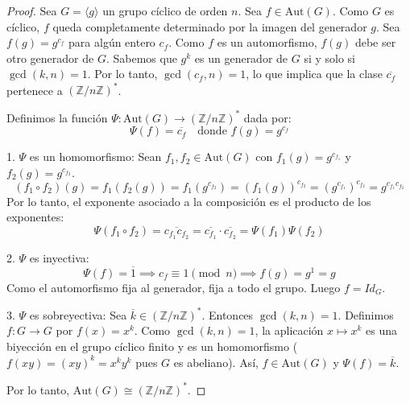 \begin{proof}
    Sea $G = \langle g \rangle$ un grupo cíclico de orden $n$.
    Sea $f \in \text{Aut}(G)$. Como $G$ es cíclico, $f$ queda completamente determinado por la imagen del generador $g$.
    Sea $f(g) = g^{c_f}$ para algún entero $c_f$.
    Como $f$ es un automorfismo, $f(g)$ debe ser otro generador de $G$.
    Sabemos que $g^k$ es un generador de $G$ si y solo si $\gcd(k, n) = 1$.
    Por lo tanto, $\gcd(c_f, n) = 1$, lo que implica que la clase $\overline{c_f}$ pertenece a $(\mathbb{Z}/n\mathbb{Z})^*$.
    
    Definimos la función $\Psi: \text{Aut}(G) \to (\mathbb{Z}/n\mathbb{Z})^*$ dada por:
    \begin{equation*}
        \Psi(f) = \overline{c_f} \quad \text{donde } f(g) = g^{c_f}
    \end{equation*}
    
    1. $\Psi$ es un homomorfismo:
    Sean $f_1, f_2 \in \text{Aut}(G)$ con $f_1(g) = g^{c_{f_1}}$ y $f_2(g) = g^{c_{f_2}}$.
    \begin{equation*}
        (f_1 \circ f_2)(g) = f_1(f_2(g)) = f_1(g^{c_{f_2}}) = (f_1(g))^{c_{f_2}} = (g^{c_{f_1}})^{c_{f_2}} = g^{c_{f_1} c_{f_2}}
    \end{equation*}
    Por lo tanto, el exponente asociado a la composición es el producto de los exponentes:
    \begin{equation*}
        \Psi(f_1 \circ f_2) = \overline{c_{f_1} c_{f_2}} = \overline{c_{f_1}} \cdot \overline{c_{f_2}} = \Psi(f_1) \Psi(f_2)
    \end{equation*}
    
    2. $\Psi$ es inyectiva:
    \begin{equation*}
        \Psi(f) = \overline{1} \implies c_f \equiv 1 \pmod n \implies f(g) = g^1 = g
    \end{equation*}
    Como el automorfismo fija al generador, fija a todo el grupo. Luego $f = Id_G$.
    
    3. $\Psi$ es sobreyectiva:
    Sea $\overline{k} \in (\mathbb{Z}/n\mathbb{Z})^*$. Entonces $\gcd(k, n) = 1$.
    Definimos $f: G \to G$ por $f(x) = x^k$.
    Como $\gcd(k, n) = 1$, la aplicación $x \mapsto x^k$ es una biyección en el grupo cíclico finito y es un homomorfismo ($f(xy) = (xy)^k = x^k y^k$ pues $G$ es abeliano).
    Así, $f \in \text{Aut}(G)$ y $\Psi(f) = \overline{k}$.
    
    Por lo tanto, $\text{Aut}(G) \cong (\mathbb{Z}/n\mathbb{Z})^*$.
\end{proof}

